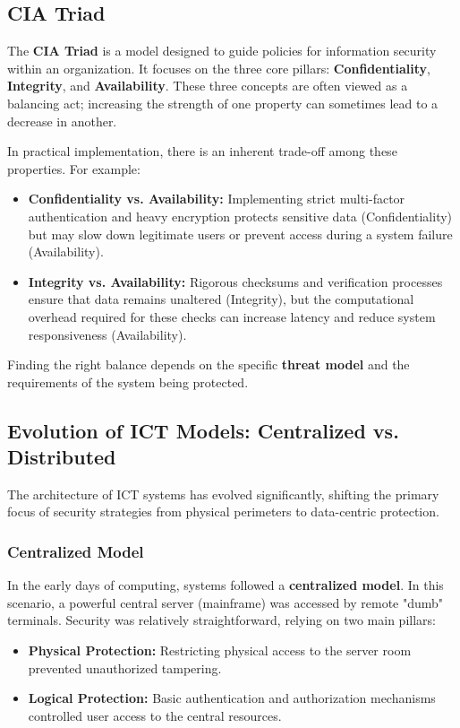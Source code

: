 \subsection{CIA Triad}

The \textbf{CIA Triad} is a model designed to guide policies for information security within an organization. It focuses on the three core pillars: \textbf{Confidentiality}, \textbf{Integrity}, and \textbf{Availability}. These three concepts are often viewed as a balancing act; increasing the strength of one property can sometimes lead to a decrease in another.

In practical implementation, there is an inherent trade-off among these properties. For example:
\begin{itemize}
    \item \textbf{Confidentiality vs. Availability:} Implementing strict multi-factor authentication and heavy encryption protects sensitive data (Confidentiality) but may slow down legitimate users or prevent access during a system failure (Availability).
    \item \textbf{Integrity vs. Availability:} Rigorous checksums and verification processes ensure that data remains unaltered (Integrity), but the computational overhead required for these checks can increase latency and reduce system responsiveness (Availability).
\end{itemize}

Finding the right balance depends on the specific \textbf{threat model} and the requirements of the system being protected.


\subsection{Evolution of ICT Models: Centralized vs. Distributed}

The architecture of ICT systems has evolved significantly, shifting the primary focus of security strategies from physical perimeters to data-centric protection.
\subsubsection*{Centralized Model}
In the early days of computing, systems followed a \textbf{centralized model}. In this scenario, a powerful central server (mainframe) was accessed by remote "dumb" terminals. Security was relatively straightforward, relying on two main pillars:
\begin{itemize}
    \item \textbf{Physical Protection:} Restricting physical access to the server room prevented unauthorized tampering.
    \item \textbf{Logical Protection:} Basic authentication and authorization mechanisms controlled user access to the central resources.
\end{itemize}

